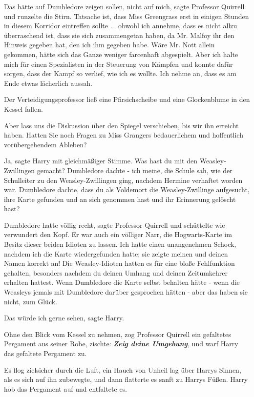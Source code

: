 \glqq{}Das hätte auf Dumbledore zeigen sollen, nicht auf mich\grqq{}, sagte
Professor Quirrell und runzelte die Stirn. \glqq{}Tatsache ist, dass Miss
Greengrass erst in einigen Stunden in diesem Korridor eintreffen sollte ...
obwohl ich annehme, dass es nicht allzu überraschend ist, dass sie sich
zusammengetan haben, da Mr. Malfoy ihr den Hinweis gegeben hat, den ich ihm
gegeben habe. Wäre Mr. Nott allein gekommen, hätte sich das Ganze weniger
farcenhaft abgespielt. Aber ich halte mich für einen Spezialisten in der
Steuerung von Kämpfen und konnte dafür sorgen, dass der Kampf so verlief, wie
ich es wollte. Ich nehme an, dass es am Ende etwas lächerlich aussah.\grqq{}

Der Verteidigungsprofessor ließ eine Pfirsichscheibe und eine Glockenblume in
den Kessel fallen.

\glqq{}Aber lass uns die Diskussion über den Spiegel verschieben, bis wir ihn
erreicht haben. Hatten Sie noch Fragen zu Miss Grangers bedauerlichem und
hoffentlich vorübergehendem Ableben?\grqq{}

\glqq{}Ja\grqq{}, sagte Harry mit gleichmäßiger Stimme. \glqq{}Was hast du mit den
Weasley-Zwillingen gemacht? Dumbledore dachte - ich meine, die Schule sah, wie
der Schulleiter zu den Weasley-Zwillingen ging, nachdem Hermine verhaftet worden
war. Dumbledore dachte, dass du als Voldemort die Weasley-Zwillinge aufgesucht,
ihre Karte gefunden und an sich genommen hast und ihr Erinnerung gelöscht hast?\grqq{}

\glqq{}Dumbledore hatte völlig recht\grqq{}, sagte Professor Quirrell und
schüttelte wie verwundert den Kopf. \glqq{}Er war auch ein völliger Narr, die
Hogwarts-Karte im Besitz dieser beiden Idioten zu lassen. Ich hatte einen
unangenehmen Schock, nachdem ich die Karte wiedergefunden hatte; sie zeigte
meinen und deinen Namen korrekt an! Die Weasley-Idioten hatten es für eine bloße
Fehlfunktion gehalten, besonders nachdem du deinen Umhang und deinen
Zeitumkehrer erhalten hattest. Wenn Dumbledore die Karte selbst behalten hätte -
wenn die Weasleys jemals mit Dumbledore darüber gesprochen hätten - aber das
haben sie nicht, zum Glück.\grqq{}

\glqq{}Das würde ich gerne sehen\grqq{}, sagte Harry.

Ohne den Blick vom Kessel zu nehmen, zog Professor Quirrell ein gefaltetes
Pergament aus seiner Robe, zischte: \glqq{}\textbf{\emph{Zeig deine
Umgebung}}\grqq{}, und warf Harry das gefaltete Pergament zu.

Es flog zielsicher durch die Luft, ein Hauch von Unheil lag über Harrys Sinnen,
als es sich auf ihn zubewegte, und dann flatterte es sanft zu Harrys Füßen.
Harry hob das Pergament auf und entfaltete es.

